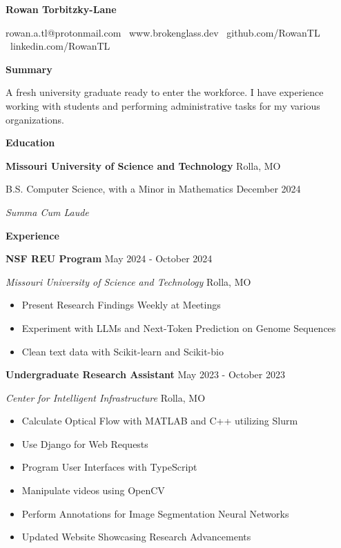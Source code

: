 \documentclass[11pt]{article}
\begin{document}
\begin{center}
    \textbf{\huge Rowan Torbitzky-Lane}\\
    \hrulefill
\end{center}

\begin{center}
    rowan.a.tl@protonmail.com \textbullet \ www.brokenglass.dev \textbullet \ github.com/RowanTL \textbullet  \ linkedin.com/RowanTL
\end{center}


\begin{center}
    \textbf{Summary}
\end{center}

A fresh university graduate ready to enter the workforce. I have experience working with students and performing administrative tasks for my various organizations.

\begin{center}
    \textbf{Education}
\end{center}
\textbf{Missouri University of Science and Technology} \hfill Rolla, MO

B.S. Computer Science, with a Minor in Mathematics \hfill December 2024

\textit{Summa Cum Laude}


\begin{center}
    \textbf{Experience}
\end{center}

\textbf{NSF REU Program} \hfill May 2024 - October 2024

\textsl{Missouri University of Science and Technology} \hfill Rolla, MO
\begin{itemize}[noitemsep]
    \item Present Research Findings Weekly at Meetings
    \item Experiment with LLMs and Next-Token Prediction on Genome Sequences
    \item Clean text data with Scikit-learn and Scikit-bio
\end{itemize}

\textbf{Undergraduate Research Assistant} \hfill May 2023 - October 2023

\textsl{Center for Intelligent Infrastructure} \hfill Rolla, MO
\begin{itemize}[noitemsep]
    \item Calculate Optical Flow with MATLAB and C++ utilizing Slurm
    \item Use Django for Web Requests
    \item Program User Interfaces with TypeScript
    \item Manipulate videos using OpenCV
    \item Perform Annotations for Image Segmentation Neural Networks
    \item Updated Website Showcasing Research Advancements
\end{itemize}
\end{document}

